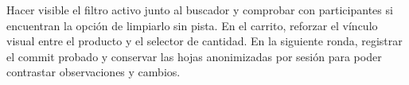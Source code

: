 Hacer visible el filtro activo junto al buscador y comprobar con participantes si encuentran la opción de limpiarlo sin pista. En el carrito, reforzar el vínculo visual entre el producto y el selector de cantidad. En la siguiente ronda, registrar el commit probado y conservar las hojas anonimizadas por sesión para poder contrastar observaciones y cambios.
